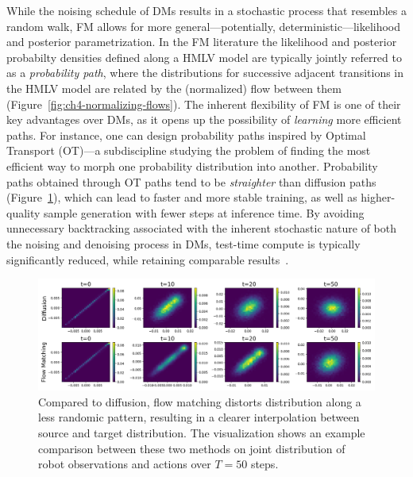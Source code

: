 While the noising schedule of DMs results in a stochastic process that resembles a random walk, FM allows for more general---potentially, deterministic---likelihood and posterior parametrization.
In the FM literature the likelihood and posterior probabilty densities defined along a HMLV model are typically jointly referred to as a \emph{probability path}, where the distributions for successive adjacent transitions in the HMLV model are related by the (normalized) flow between them (Figure~\ref{fig:ch4-normalizing-flows}).
The inherent flexibility of FM is one of their key advantages over DMs, as it opens up the possibility of \emph{learning} more efficient paths.
For instance, one can design probability paths inspired by Optimal Transport (OT)---a subdiscipline studying the problem of finding the most efficient way to morph one probability distribution into another.
Probability paths obtained through OT paths tend to be \emph{straighter} than diffusion paths (Figure~\ref{fig:ch4-diffusion-paths-versus-fm}), which can lead to faster and more stable training, as well as higher-quality sample generation with fewer steps at inference time.
By avoiding unnecessary backtracking associated with the inherent stochastic nature of both the noising and denoising process in DMs, test-time compute is typically significantly reduced, while retaining comparable results~\citep{lipmanFlowMatchingGenerative2023}.

\begin{figure}
    \centering
    \includegraphics[width=\textwidth]{figures/ch4/ch4-diffusion-vs-flowmatching.png}
    \caption{Compared to diffusion, flow matching distorts distribution along a less randomic pattern, resulting in a clearer interpolation between source and target distribution. The visualization shows an example comparison between these two methods on joint distribution of robot observations and actions over \( T=50 \) steps.}
    \label{fig:ch4-diffusion-paths-versus-fm}
\end{figure}


